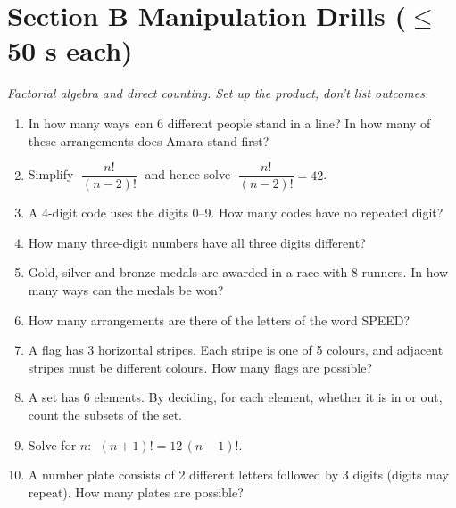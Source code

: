 \documentclass[11pt,a4paper]{article}
\begin{document}
\section*{Section B \quad Manipulation Drills \hfill{\normalfont\small($\leq$50 s each)}}

\noindent\textit{Factorial algebra and direct counting. Set up the product, don't list outcomes.}

\begin{enumerate}

\item In how many ways can 6 different people stand in a line? In how many of these arrangements does Amara stand first?

\item Simplify $\;\dfrac{n!}{(n-2)!}\;$ and hence solve $\;\dfrac{n!}{(n-2)!} = 42$.

\item A 4-digit code uses the digits 0--9. How many codes have no repeated digit?

\item How many three-digit numbers have all three digits different?

\item Gold, silver and bronze medals are awarded in a race with 8 runners. In how many ways can the medals be won?

\item How many arrangements are there of the letters of the word SPEED?

\item A flag has 3 horizontal stripes. Each stripe is one of 5 colours, and adjacent stripes must be different colours. How many flags are possible?

\item A set has 6 elements. By deciding, for each element, whether it is in or out, count the subsets of the set.

\item Solve for $n$: $\;(n+1)! = 12\,(n-1)!$.

\item A number plate consists of 2 different letters followed by 3 digits (digits may repeat). How many plates are possible?

\end{enumerate}

\end{document}
